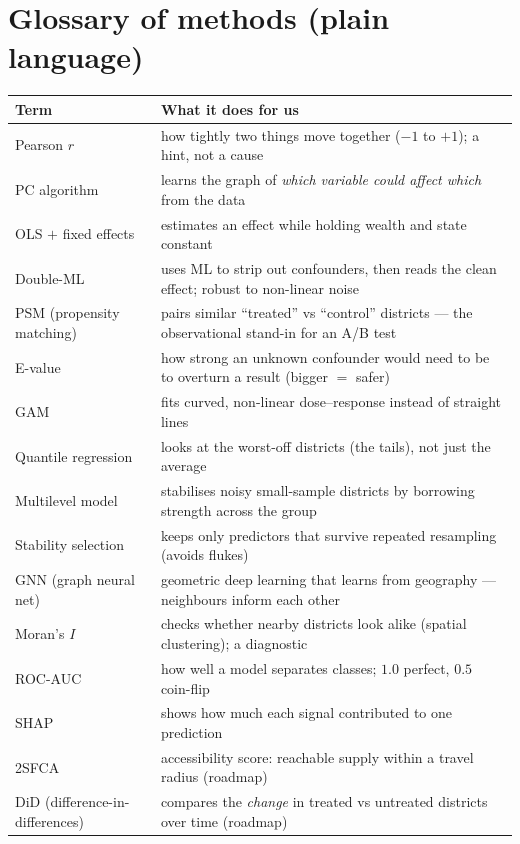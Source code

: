 \documentclass[11pt]{article}
\begin{document}
\appendix
\section{Glossary of methods (plain language)}
\small
\begin{tabular}{ll}
\toprule
Term & What it does for us\\
\midrule
Pearson $r$ & how tightly two things move together ($-1$ to $+1$); a hint, not a cause\\
PC algorithm & learns the graph of \emph{which variable could affect which} from the data\\
OLS $+$ fixed effects & estimates an effect while holding wealth and state constant\\
Double-ML & uses ML to strip out confounders, then reads the clean effect; robust to non-linear noise\\
PSM (propensity matching) & pairs similar ``treated'' vs ``control'' districts --- the observational stand-in for an A/B test\\
E-value & how strong an unknown confounder would need to be to overturn a result (bigger $=$ safer)\\
GAM & fits curved, non-linear dose--response instead of straight lines\\
Quantile regression & looks at the worst-off districts (the tails), not just the average\\
Multilevel model & stabilises noisy small-sample districts by borrowing strength across the group\\
Stability selection & keeps only predictors that survive repeated resampling (avoids flukes)\\
GNN (graph neural net) & geometric deep learning that learns from geography --- neighbours inform each other\\
Moran's $I$ & checks whether nearby districts look alike (spatial clustering); a diagnostic\\
ROC-AUC & how well a model separates classes; $1.0$ perfect, $0.5$ coin-flip\\
SHAP & shows how much each signal contributed to one prediction\\
2SFCA & accessibility score: reachable supply within a travel radius (roadmap)\\
DiD (difference-in-differences) & compares the \emph{change} in treated vs untreated districts over time (roadmap)\\
\bottomrule
\end{tabular}
\end{document}
